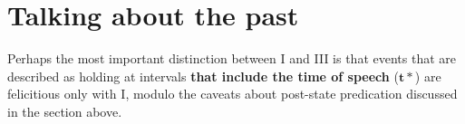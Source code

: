 %
%
%
%


\section{Talking about the past}\label{sec:djr-pst}



Perhaps the most important distinction between \gls{I} and \gls{III} is that events that are described as holding at intervals  \textbf{that include the time of speech} ($\boldsymbol{t*} $) are felicitious only with \gls{I}, modulo the caveats about post-state predication discussed in the section above.


